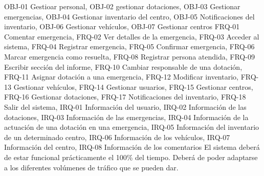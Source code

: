 {\reportauthors}
{}
{OBJ-01 Gestioar personal, OBJ-02 gestionar dotaciones, OBJ-03 Gestionar emergencias, OBJ-04 Gestionar inventario del centro, OBJ-05 Notificaciones del inventario, OBJ-06 Gestionar vehículos, OBJ-07 Gestionar centros}
{FRQ-01 Comentar emergencia, FRQ-02 Ver detalles de la emergencia, FRQ-03 Acceder al sistema, FRQ-04 Registrar emergencia, FRQ-05 Confirmar emergencia, FRQ-06 Marcar emergencia como resuelta, FRQ-08 Registrar persona atendida, FRQ-09 Escribir sección del informe, FRQ-10 Cambiar responsable de una dotación, FRQ-11 Asignar dotación a una emergencia, FRQ-12 Modificar inventario, FRQ-13 Gestionar vehículos, FRQ-14 Gestionar usuarios, FRQ-15 Gestionar centros, FRQ-16 Gestionar dotaciones, FRQ-17 Notificaciones del inventario, FRQ-18 Salir del sistema, IRQ-01 Información del usuario, IRQ-02 Información de las dotaciones, IRQ-03 Información de las emergencias, IRQ-04 Información de la actuación de una dotación en una emergencia, IRQ-05 Información del inventario de un determinado centro, IRQ-06 Información de los vehículos, IRQ-07 Información del centro, IRQ-08 Información de los comentarios}
{El sistema deberá de estar funcional prácticamente el 100\% del tiempo. Deberá de poder adaptarse a los diferentes volúmenes de tráfico que se pueden dar.}

